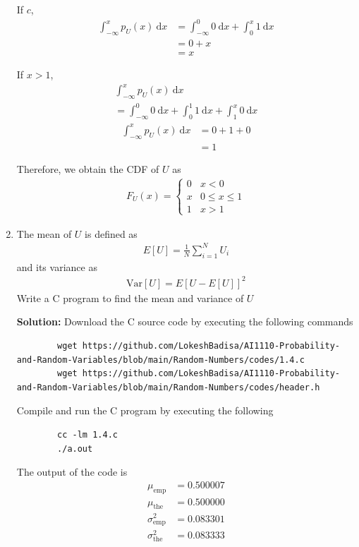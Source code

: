 \documentclass[journal,12pt,twocolumn]{IEEEtran}
\newcommand{\solution}{\noindent \textbf{Solution: }}
\providecommand{\mean}[1]{E\left[ #1 \right]}
\providecommand{\var}[1]{\mathrm{Var}\left[ #1 \right]}
\numberwithin{equation}{section}
\renewcommand\thesection{\arabic{section}}
\begin{document}
\begin{enumerate}[label=\thesection.\arabic*,ref=\thesection.\theenumi]
	If $c$,
	\begin{align}
		\int_{-\infty}^x p_{U}(x) ~\mathrm{d}x &= \int_{-\infty}^0 0 ~\mathrm{d}x + \int_0^x 1 ~\mathrm{d}x \\
		&= 0 + x \\
		&= x
	\end{align}
	
	If $x>1$,
	\begin{multline}
		\int_{-\infty}^x p_{U}(x) ~\mathrm{d}x \\= \int_{-\infty}^0 0 ~\mathrm{d}x + \int_0^1 1 ~\mathrm{d}x +  \int_1^x 0 ~\mathrm{d}x 
	\end{multline}
	\begin{align}
		\int_{-\infty}^x p_{U}(x) ~\mathrm{d}x &= 0 + 1 + 0 \\
		&= 1
	\end{align}
	
	Therefore, we obtain the CDF of $U$ as
	\begin{align}
		F_{U}(x) = 
		\begin{cases}
			0 & x < 0 \\
			x & 0 \le x \le 1 \\
			1 & x > 1
		\end{cases}
	\end{align}
	
	\item The mean of $U$ is defined as
	\begin{align}
		\mean{U} = \frac{1}{N}\sum_{i=1}^{N}U_i
	\end{align}
	and its variance as
	\begin{align}
		\var{U} = \mean{U- \mean{U}}^2 
	\end{align}
	Write a C program to  find the mean and variance of $U$
	
	\solution Download the C source code by executing the following commands
	\begin{lstlisting}
		wget https://github.com/LokeshBadisa/AI1110-Probability-and-Random-Variables/blob/main/Random-Numbers/codes/1.4.c
		wget https://github.com/LokeshBadisa/AI1110-Probability-and-Random-Variables/blob/main/Random-Numbers/codes/header.h
	\end{lstlisting}
	Compile and run the C program by executing the following
	\begin{lstlisting}
		cc -lm 1.4.c
		./a.out
	\end{lstlisting}
	The output of the code is
	\begin{align}
		\mu_{\text{emp}} &= 0.500007 \\
		\mu_{\text{the}} &= 0.500000 \\
		\sigma_{\text{emp}}^2 &= 0.083301 \\
		\sigma_{\text{the}}^2 &= 0.083333
	\end{align}
	

\end{enumerate}
\end{document}
